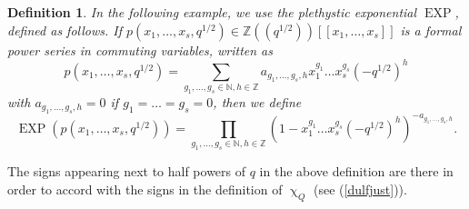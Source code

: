 \documentclass[a4paper,10pt]{amsart}
\newtheorem{definition}[theorem]{Definition}
\renewcommand{\chi}{\upchi}
\DeclareMathOperator{\EXP}{EXP}
\begin{document}
\begin{definition}\label{plethDef}
In the following example, we use the plethystic exponential $\EXP$, defined as follows.  If $p(x_1,\ldots,x_s,q^{1/2})\in\mathbb{Z}((q^{1/2}))[[x_1,\ldots,x_s]]$ is a formal power series in commuting variables, written as
\[
p(x_1,\ldots,x_s,q^{1/2})=\sum_{g_1,\ldots,g_s\in\mathbb{N},h\in \mathbb{Z}}a_{g_1,\ldots,g_s,h}x_1^{g_1}\ldots x_s^{g_s}(-q^{1/2})^h
\]
with $a_{g_1,\ldots,g_s,h}=0$ if $g_1=\ldots = g_s=0$, then we define
\[
\EXP\left(p(x_1,\ldots,x_s,q^{1/2})\right)=\prod_{g_1,\ldots,g_s\in\mathbb{N},h\in \mathbb{Z}}(1-x_1^{g_1}\ldots x_s^{g_s}(-q^{1/2})^h)^{-a_{g_1,\ldots,g_s,h}}.
\]
\end{definition}
The signs appearing next to half powers of $q$ in the above definition are there in order to accord with the signs in the definition of $\chi_Q$ (see (\ref{dulfjust})).
\end{document}

